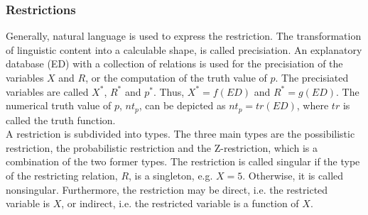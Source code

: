 \documentclass[conference]{IEEEtran}
\begin{document}
\subsubsection{Restrictions}
\label{subsubsec:restrictions}
Generally, natural language is used to express the restriction. The transformation of linguistic content into a calculable shape, is called precisiation. An explanatory database (ED) with a collection of relations is used for the precisiation of the variables \begin{math} X \end{math} and \begin{math} R \end{math}, or the computation of the truth value of \begin{math} p \end{math}. The precisiated variables are called \begin{math} X^{*} \end{math}, \begin{math} R^{*} \end{math} and \begin{math}p^{*} \end{math}. Thus, \begin{math} X^{*}=f(ED) \end{math} and \begin{math} R^{*}=g(ED) \end{math}. The numerical truth value of \begin{math} p \end{math}, \begin{math}nt_{p} \end{math}, can be depicted as \begin{math} nt_{p}=tr(ED) \end{math}, where \begin{math} tr \end{math} is called the truth function.\\
A restriction is subdivided into types. The three main types are the possibilistic restriction, the probabilistic restriction and the Z-restriction, which is a combination of the two former types. The restriction is called singular if the type of the restricting relation, \begin{math} R \end{math}, is a singleton, e.g. \begin{math} X=5 \end{math}. Otherwise, it is called nonsingular. Furthermore, the restriction may be direct, i.e. the restricted variable is \begin{math} X \end{math}, or indirect, i.e. the restricted variable is a function of \begin{math} X \end{math}.\\
\end{document}

